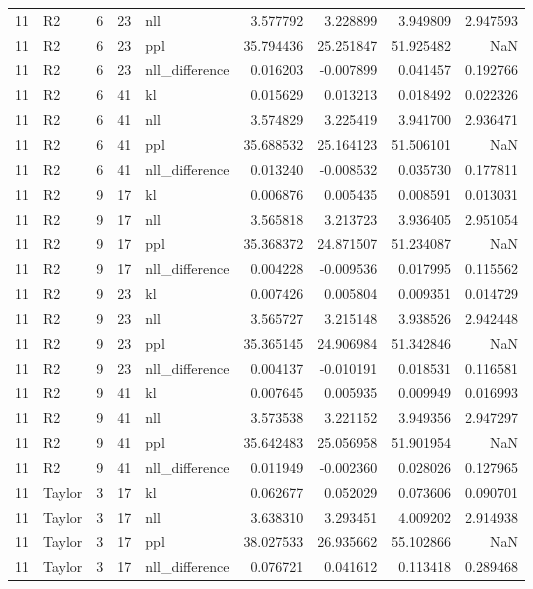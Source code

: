 \begin{tabular}{rlrrlrrrr}
11 & R2 & 6 & 23 & nll & 3.577792 & 3.228899 & 3.949809 & 2.947593 \\
11 & R2 & 6 & 23 & ppl & 35.794436 & 25.251847 & 51.925482 & NaN \\
11 & R2 & 6 & 23 & nll_difference & 0.016203 & -0.007899 & 0.041457 & 0.192766 \\
11 & R2 & 6 & 41 & kl & 0.015629 & 0.013213 & 0.018492 & 0.022326 \\
11 & R2 & 6 & 41 & nll & 3.574829 & 3.225419 & 3.941700 & 2.936471 \\
11 & R2 & 6 & 41 & ppl & 35.688532 & 25.164123 & 51.506101 & NaN \\
11 & R2 & 6 & 41 & nll_difference & 0.013240 & -0.008532 & 0.035730 & 0.177811 \\
11 & R2 & 9 & 17 & kl & 0.006876 & 0.005435 & 0.008591 & 0.013031 \\
11 & R2 & 9 & 17 & nll & 3.565818 & 3.213723 & 3.936405 & 2.951054 \\
11 & R2 & 9 & 17 & ppl & 35.368372 & 24.871507 & 51.234087 & NaN \\
11 & R2 & 9 & 17 & nll_difference & 0.004228 & -0.009536 & 0.017995 & 0.115562 \\
11 & R2 & 9 & 23 & kl & 0.007426 & 0.005804 & 0.009351 & 0.014729 \\
11 & R2 & 9 & 23 & nll & 3.565727 & 3.215148 & 3.938526 & 2.942448 \\
11 & R2 & 9 & 23 & ppl & 35.365145 & 24.906984 & 51.342846 & NaN \\
11 & R2 & 9 & 23 & nll_difference & 0.004137 & -0.010191 & 0.018531 & 0.116581 \\
11 & R2 & 9 & 41 & kl & 0.007645 & 0.005935 & 0.009949 & 0.016993 \\
11 & R2 & 9 & 41 & nll & 3.573538 & 3.221152 & 3.949356 & 2.947297 \\
11 & R2 & 9 & 41 & ppl & 35.642483 & 25.056958 & 51.901954 & NaN \\
11 & R2 & 9 & 41 & nll_difference & 0.011949 & -0.002360 & 0.028026 & 0.127965 \\
11 & Taylor & 3 & 17 & kl & 0.062677 & 0.052029 & 0.073606 & 0.090701 \\
11 & Taylor & 3 & 17 & nll & 3.638310 & 3.293451 & 4.009202 & 2.914938 \\
11 & Taylor & 3 & 17 & ppl & 38.027533 & 26.935662 & 55.102866 & NaN \\
11 & Taylor & 3 & 17 & nll_difference & 0.076721 & 0.041612 & 0.113418 & 0.289468 \\

\end{tabular}
